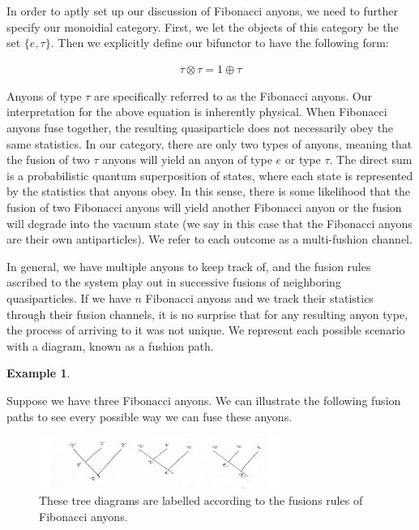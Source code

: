 \documentclass[10pt]{ucthesis}
\newtheorem{example}[definition]{Example}
\begin{document}
In order to aptly set up our discussion of Fibonacci anyons, we need to further specify our monoidial category. First, we let the objects of this category be the set $\{e,\tau\}$. Then we explicitly define our bifunctor to have the following form:

\begin{equation}
	\begin{aligned}
		\tau \otimes \tau = 1\oplus \tau
	\end{aligned}
\end{equation}

Anyons of type $\tau$ are specifically referred to as the Fibonacci anyons. Our interpretation for the above equation is inherently physical. When Fibonacci anyons fuse together, the resulting quasiparticle does not necessarily obey the same statistics. In our category, there are only two types of anyons, meaning that the fusion of two $\tau$ anyons will yield an anyon of type $e$ or type $\tau$. The direct sum is a probabilistic quantum superposition of states, where each state is represented by the statistics that anyons obey. In this sense, there is some likelihood that the fusion of two Fibonacci anyons will yield another Fibonacci anyon or the fusion will degrade into the vacuum state (we say in this case that the Fibonacci anyons are their own antiparticles). We refer to each outcome as a multi-fushion channel.

In general, we have multiple anyons to keep track of, and the fusion rules ascribed to the system play out in successive fusions of neighboring quasiparticles. If we have $n$ Fibonacci anyons and we track their statistics through their fusion channels, it is no surprise that for any resulting anyon type, the process of arriving to it was not unique. We represent each possible scenario with a diagram, known as a fushion path.

\begin{example}\end{example} 
Suppose we have three Fibonacci anyons. We can illustrate the following fusion paths to see every possible way we can fuse these anyons.

\begin{figure}[H]
	\centering
	\includegraphics[width=0.7\textwidth]{treebasis.png}
	\caption{These tree diagrams are labelled according to the fusions rules of Fibonacci anyons.}
\end{figure}
\end{document}
